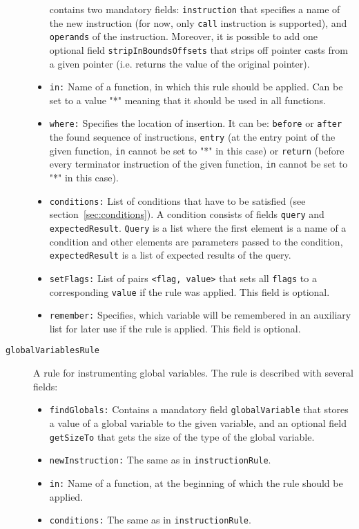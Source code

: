 \begin{description}
\begin{itemize}
    contains two mandatory fields: \texttt{instruction} that specifies a name
    of the new instruction (for now, only \texttt{call} instruction is
    supported), and \texttt{operands} of the instruction. Moreover, it is
    possible to add one optional field \texttt{stripInBoundsOffsets} that
    strips off pointer casts from a given pointer (i.e. returns the value of
    the original pointer).
    \item \texttt{in:} Name of a function, in which this rule should be
    applied. Can be set to a value "*" meaning that it should be used in all
    functions.
    \item \texttt{where:} Specifies the location of insertion. It can be:
      \texttt{before} or \texttt{after} the found sequence of instructions,
      \texttt{entry} (at the entry point of the given function, \texttt{in}
      cannot be set to "*" in this case) or \texttt{return} (before every
      terminator instruction of the given function, \texttt{in} cannot be set to
      "*" in this case).
    \item \texttt{conditions:} List of conditions that have to be satisfied
    (see section~\ref{sec:conditions}). A condition consists of fields
    \texttt{query} and \texttt{expectedResult}. \texttt{Query} is a list
    where the first element is a name of a condition and other elements are
    parameters passed to the condition, \texttt{expectedResult} is a list of
    expected results of the query.
    \item \texttt{setFlags:} List of pairs \texttt{<flag, value>} that sets
      all \texttt{flags} to a corresponding \texttt{value} if the rule was
      applied. This field is optional.
    \item \texttt{remember:} Specifies, which variable will be remembered in an
    auxiliary list for later use if the rule is applied. This field is optional.

  \end{itemize}
\item[\texttt{globalVariablesRule}] A rule for instrumenting global
  variables. The rule is described with several fields:
  \begin{itemize}
    \item \texttt{findGlobals:} Contains a mandatory field
    \texttt{globalVariable} that stores a value of a global variable to the
    given variable, and an optional field \texttt{getSizeTo} that gets the
    size of the type of the global variable.
    \item \texttt{newInstruction:} The same as in \texttt{instructionRule}.
    \item \texttt{in:} Name of a function, at the beginning of which the rule
    should be applied.
    \item \texttt{conditions:} The same as in \texttt{instructionRule}.

  \end{itemize}

\end{description}

